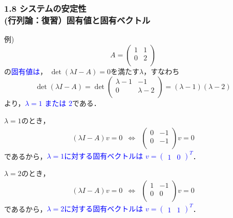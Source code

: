 \documentclass[10pt]{beamer}
\begin{document}
\begin{frame}[t]
\frametitle{1.8 システムの安定性 \\
 (行列論：復習）固有値と固有ベクトル}
例)
\begin{equation}
 A = \left(
      \begin{array}{cc}
       1 & 1 \\
       0 & 2 \\
      \end{array}
     \right)
\end{equation}
の\textcolor{blue}{固有値は}，
$\operatorname{det}(\lambda I - A) = 0$を満たす$\lambda$，すなわち
\begin{equation}
 \operatorname{det}(\lambda I - A) =
 \operatorname{det}
 \left(
 \begin{array}{cc}
  \lambda - 1 & -1 \\
  0           & \lambda - 2 \\
 \end{array}
 \right) =
 (\lambda - 1)(\lambda - 2)
\end{equation}
より，\textcolor{blue}{$\lambda = 1$ または $2$}である．

$\lambda = 1$のとき，
\begin{equation}
 \begin{array}{ccc}
 (\lambda I - A) v = 0
 &\Leftrightarrow&
 \left(
 \begin{array}{cc}
  0 & -1 \\
  0 & -1 \\
 \end{array}
 \right) v = 0
 \end{array}
\end{equation}
であるから，\textcolor{blue}{$\lambda = 1$に対する固有ベクトルは
$v = (\begin{array}{cc}1 & 0\end{array})^T$}．

$\lambda = 2$のとき，
\begin{equation}
 \begin{array}{ccc}
 (\lambda I - A) v = 0
 &\Leftrightarrow&
 \left(
 \begin{array}{cc}
  1 & -1 \\
  0 & 0 \\
 \end{array}
 \right) v = 0
 \end{array}
\end{equation}
であるから，\textcolor{blue}{$\lambda = 2$に対する固有ベクトルは
    $v = (\begin{array}{cc}1 & 1\end{array})^T$}．
\end{frame}
\end{document}
